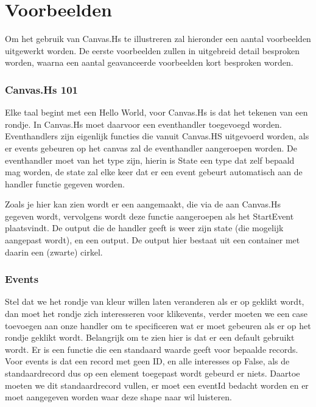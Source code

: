 \section{Voorbeelden}
Om het gebruik van Canvas.Hs te illustreren zal hieronder een aantal voorbeelden uitgewerkt worden. De eerste voorbeelden zullen in uitgebreid detail besproken worden, waarna een aantal geavanceerde voorbeelden kort besproken worden.

\subsubsection{Canvas.Hs 101}
Elke taal begint met een Hello World, voor Canvas.Hs is dat het tekenen van een rondje. In Canvas.Hs moet daarvoor een eventhandler toegevoegd worden. Eventhandlers zijn eigenlijk functies die vanuit Canvas.HS uitgevoerd worden, als er events gebeuren op het canvas zal de eventhandler aangeroepen worden. De eventhandler moet van het type  zijn, hierin is State een type dat zelf bepaald mag worden, de state zal elke keer dat er een event gebeurt automatisch aan de handler functie gegeven worden.



Zoals je hier kan zien wordt er een  aangemaakt, die via de  aan Canvas.Hs gegeven wordt, vervolgens wordt deze functie aangeroepen als het StartEvent plaatsvindt. De output die de handler geeft is weer zijn state (die mogelijk aangepast wordt), en een output. De output hier bestaat uit een container met daarin een (zwarte) cirkel.

\subsubsection{Events}
Stel dat we het rondje van kleur willen laten veranderen als er op geklikt wordt, dan moet het rondje zich interesseren voor klikevents, verder moeten we een case toevoegen aan onze handler om te specificeren wat er moet gebeuren als er op het rondje geklikt wordt. Belangrijk om te zien hier is dat er een default gebruikt wordt. Er is een functie die een standaard waarde geeft voor bepaalde records. Voor events is dat een record met geen ID, en alle interesses op False, als de standaardrecord dus op een element toegepast wordt gebeurd er niets. Daartoe moeten we dit standaardrecord vullen, er moet een eventId bedacht worden en er moet aangegeven worden waar deze shape naar wil luisteren.

